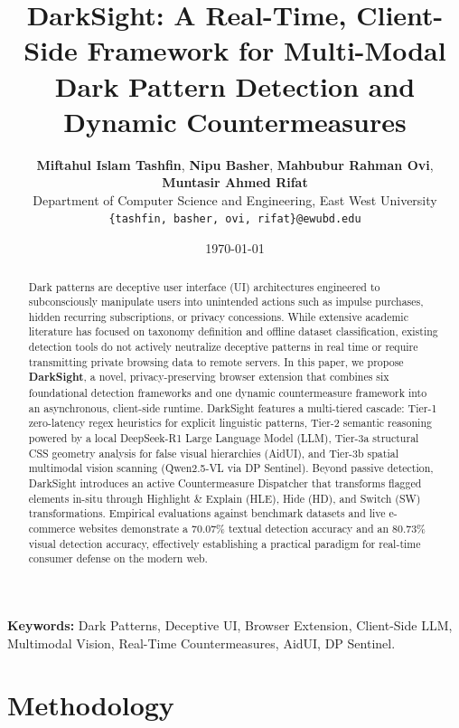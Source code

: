 \documentclass[11pt,a4paper]{article}
\title{\textbf{DarkSight: A Real-Time, Client-Side Framework for Multi-Modal Dark Pattern Detection and Dynamic Countermeasures}}
\author{
    \textbf{Miftahul Islam Tashfin}, \textbf{Nipu Basher}, \textbf{Mahbubur Rahman Ovi}, \textbf{Muntasir Ahmed Rifat} \\[0.5em]
    \small Department of Computer Science and Engineering, East West University \\
    \small \texttt{\{tashfin, basher, ovi, rifat\}@ewubd.edu}
}
\date{\today}
\begin{document}
\maketitle

\begin{abstract}
\noindent Dark patterns are deceptive user interface (UI) architectures engineered to subconsciously manipulate users into unintended actions such as impulse purchases, hidden recurring subscriptions, or privacy concessions. While extensive academic literature has focused on taxonomy definition and offline dataset classification, existing detection tools do not actively neutralize deceptive patterns in real time or require transmitting private browsing data to remote servers. In this paper, we propose \textbf{DarkSight}, a novel, privacy-preserving browser extension that combines six foundational detection frameworks and one dynamic countermeasure framework into an asynchronous, client-side runtime. DarkSight features a multi-tiered cascade: Tier-1 zero-latency regex heuristics for explicit linguistic patterns, Tier-2 semantic reasoning powered by a local DeepSeek-R1 Large Language Model (LLM), Tier-3a structural CSS geometry analysis for false visual hierarchies (AidUI), and Tier-3b spatial multimodal vision scanning (Qwen2.5-VL via DP Sentinel). Beyond passive detection, DarkSight introduces an active Countermeasure Dispatcher that transforms flagged elements in-situ through Highlight \& Explain (HLE), Hide (HD), and Switch (SW) transformations. Empirical evaluations against benchmark datasets and live e-commerce websites demonstrate a 70.07\% textual detection accuracy and an 80.73\% visual detection accuracy, effectively establishing a practical paradigm for real-time consumer defense on the modern web.
\end{abstract}

\vspace{1em}
\noindent \textbf{Keywords:} Dark Patterns, Deceptive UI, Browser Extension, Client-Side LLM, Multimodal Vision, Real-Time Countermeasures, AidUI, DP Sentinel.

\vspace{2em}

\section{Methodology}
\label{sec:methodology}
\end{document}
